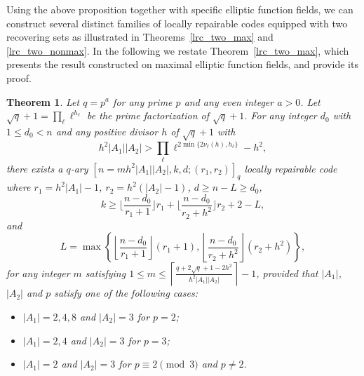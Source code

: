 \documentclass[journal,12pt,onecolumn]{IEEEtran}
\newtheorem{theorem}{Theorem}
\begin{document}
Using the above proposition together with specific elliptic function fields, we can construct several distinct families of locally repairable codes equipped with two recovering sets as illustrated in Theorems~\ref{lrc_two_max} and \ref{lrc_two_nonmax}. In the following we restate Theorem~\ref{lrc_two_max}, which presents the result constructed on maximal elliptic function fields, and provide its proof. 

\begin{theorem}\label{lrc_two_max_restate}
    Let \( q = p^a \) for any prime \( p \) and any even integer \( a > 0 \). Let \(\sqrt{q}+1 = \prod_\ell \ell^{h_\ell}\)  be the prime factorization of \( \sqrt{q} + 1 \). For any integer \( d_0 \) with \( 1 \leq d_0 < n \) and any positive divisor \( h \) of \( \sqrt{q} + 1 \) with
    \begin{equation}\label{lrc_two_repair_condition}
        h^2|A_1||A_2|>\prod_\ell \ell^{2\min\{2\nu_\ell(h),h_\ell\}}-h^2,
    \end{equation}
    there exists a \( q \)-ary \([n = mh^2|A_1||A_2|, k, d;(r_1,r_2)]_q\) locally repairable code where \( r_1 = h^2|A_1| - 1 \), \(r_2 = h^2(|A_2|-1)\), \(d \ge n - L \ge d_0\), 
    \[
        k \geq \bigg\lfloor\frac{n-d_0}{r_1 + 1}\bigg\rfloor r_1 + \bigg\lfloor\frac{n-d_0}{r_2 + h^2}\bigg\rfloor r_2  + 2 - L,
    \]
    and
    \[
        L = \max\left\{\left\lfloor\frac{n-d_0}{r_1 + 1}\right\rfloor (r_1+1),\left\lfloor\frac{n-d_0}{r_2 + h^2}\right\rfloor (r_2 + h^2)\right\}, 
    \]
    for any integer \( m \) satisfying \(1 \leq m \leq \left\lceil \frac{q+2\sqrt{q}+1-2h^2}{h^2|A_1||A_2|} \right\rceil - 1 \), provided that \(|A_1|\), \(|A_2|\) and \( p \) satisfy one of the following cases:
     
    \begin{itemize}
        \item[(i)] \(|A_1| = 2,4,8\) and \(|A_2| = 3\) for \( p = 2 \);  
        \item[(ii)] \(|A_1| = 2,4\) and \(|A_2| = 3\) for \( p = 3 \);  
        \item[(iii)] \(|A_1| = 2\) and \(|A_2| = 3\) for \( p \equiv 2 \pmod{3} \) and \( p \neq 2 \).
    \end{itemize}
\end{theorem}
\end{document}
